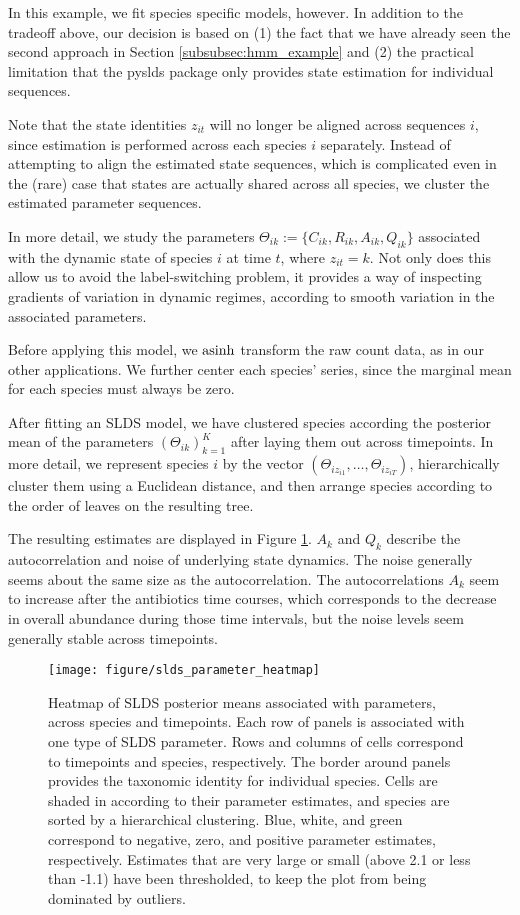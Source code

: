 \documentclass[14pt]{extarticle}
\begin{document}
In this example, we fit species specific models, however. In addition to the
tradeoff above, our decision is based on (1) the fact that we have already seen
the second approach in Section \ref{subsubsec:hmm_example} and (2) the practical
limitation that the pyslds package only provides state estimation for individual
sequences.

Note that the state identities $z_{it}$ will no longer be aligned across
sequences $i$, since estimation is performed across each species $i$ separately.
Instead of attempting to align the estimated state sequences, which is
complicated even in the (rare) case that states are actually shared across all
species, we cluster the estimated parameter sequences.

In more detail, we study the parameters $\Theta_{ik} := \{C_{ik}, R_{ik},
A_{ik}, Q_{ik}\}$ associated with the dynamic state of species $i$ at time $t$,
where $z_{it} = k$. Not only does this allow us to avoid the label-switching
problem, it provides a way of inspecting gradients of variation in dynamic
regimes, according to smooth variation in the associated parameters.

Before applying this model, we $\mathop\mathrm{asinh}$ transform the raw count data, as in our
other applications. We further center each species' series, since the marginal
mean for each species must always be zero.

After fitting an SLDS model, we have clustered species according the posterior
mean of the parameters $\left(\Theta_{ik}\right)_{k =1}^{K}$ after laying them
out across timepoints. In more detail, we represent species $i$ by the vector
$\left(\Theta_{i z_{i1}}, \dots, \Theta_{i z_{iT}}\right)$, hierarchically
cluster them using a Euclidean distance, and then arrange species according to
the order of leaves on the resulting tree.

The resulting estimates are displayed in Figure
\ref{fig:slds_parameter_heatmap}. $A_k$ and $Q_k$ describe the autocorrelation
and noise of underlying state dynamics. The noise generally seems about the same
size as the autocorrelation. The autocorrelations $A_{k}$ seem to increase after
the antibiotics time courses, which corresponds to the decrease in overall
abundance during those time intervals, but the noise levels seem generally
stable across timepoints.

\begin{figure}
  \centering
  \texttt{[image: figure/slds\_parameter\_heatmap]}
  \caption{Heatmap of SLDS posterior means associated with parameters, across
    species and timepoints. Each row of panels is associated with one type of
    SLDS parameter. Rows and columns of cells correspond to timepoints and
    species, respectively. The border around panels provides the taxonomic
    identity for individual species. Cells are shaded in according to their
    parameter estimates, and species are sorted by a hierarchical clustering.
    Blue, white, and green correspond to negative, zero, and positive parameter
    estimates, respectively. Estimates that are very large or small (above 2.1
    or less than -1.1) have been thresholded, to keep the plot from being
    dominated by outliers. \label{fig:slds_parameter_heatmap}
  }
\end{figure}
\end{document}
